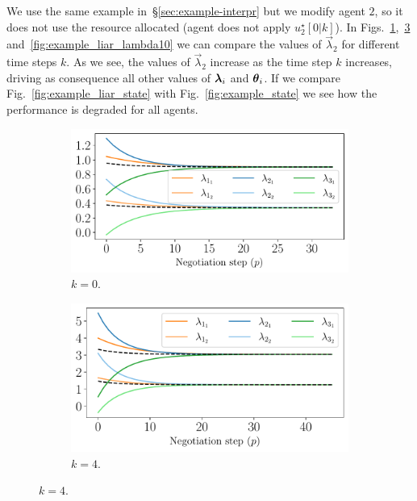 \documentclass[../main.tex]{subfiles}
\begin{document}
We use the same example in~\S\ref{sec:example-interpr} but we modify agent $2$, so it does not use the resource allocated (agent does not apply $u_{2}^{\star}[0|k]$).
In Figs.~\ref{fig:example_liar_lambda1},~\ref{fig:example_liar_lambda5} and~\ref{fig:example_liar_lambda10} we can compare the values of $\vec{\lambda}_{2}$ for different time steps $k$.
As we see, the values of $\vec{\lambda}_{2}$ increase as the time step $k$ increases, driving as consequence all other values of $\boldsymbol{\lambda}_i$ and $\boldsymbol{\theta}_i$.
If we compare Fig.~\ref{fig:example_liar_state} with Fig.~\ref{fig:example_state} we see how the performance is degraded for all agents.
\begin{figure}[h]
  \centering
  \begin{subfigure}{0.45\textwidth}
    \includegraphics[width=\textwidth]{../img/example_primal_decomposition/example_liar_lambda_k_0.pdf}
    \caption{$k=0$.}\label{fig:example_liar_lambda1}
  \end{subfigure}
  \hfill
  \begin{subfigure}{0.45\textwidth}
    \includegraphics[width=\textwidth]{../img/example_primal_decomposition/example_liar_lambda_k_4.pdf}
    \caption{$k=4$.}\label{fig:example_liar_lambda5}

\end{subfigure}
\end{figure}
\end{document}
